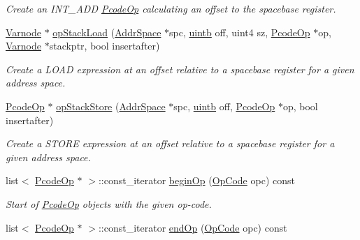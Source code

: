 \begin{DoxyCompactItemize}
\begin{DoxyCompactList}\small\item\em Create an I\+N\+T\+\_\+\+A\+DD \mbox{\hyperlink{class_pcode_op}{Pcode\+Op}} calculating an offset to the {\itshape spacebase} register. \end{DoxyCompactList}\item 
\mbox{\hyperlink{class_varnode}{Varnode}} $\ast$ \mbox{\hyperlink{class_funcdata_a37b36505bab6f7c5676157288e65d5c6}{op\+Stack\+Load}} (\mbox{\hyperlink{class_addr_space}{Addr\+Space}} $\ast$spc, \mbox{\hyperlink{types_8h_a2db313c5d32a12b01d26ac9b3bca178f}{uintb}} off, uint4 sz, \mbox{\hyperlink{class_pcode_op}{Pcode\+Op}} $\ast$op, \mbox{\hyperlink{class_varnode}{Varnode}} $\ast$stackptr, bool insertafter)
\begin{DoxyCompactList}\small\item\em Create a L\+O\+AD expression at an offset relative to a {\itshape spacebase} register for a given address space. \end{DoxyCompactList}\item 
\mbox{\hyperlink{class_pcode_op}{Pcode\+Op}} $\ast$ \mbox{\hyperlink{class_funcdata_a4582ad34b4e7c851d92db8544999eaf3}{op\+Stack\+Store}} (\mbox{\hyperlink{class_addr_space}{Addr\+Space}} $\ast$spc, \mbox{\hyperlink{types_8h_a2db313c5d32a12b01d26ac9b3bca178f}{uintb}} off, \mbox{\hyperlink{class_pcode_op}{Pcode\+Op}} $\ast$op, bool insertafter)
\begin{DoxyCompactList}\small\item\em Create a S\+T\+O\+RE expression at an offset relative to a {\itshape spacebase} register for a given address space. \end{DoxyCompactList}\item 
list$<$ \mbox{\hyperlink{class_pcode_op}{Pcode\+Op}} $\ast$ $>$\+::const\+\_\+iterator \mbox{\hyperlink{class_funcdata_a47de4c82b4a74b356153eb8e4215f639}{begin\+Op}} (\mbox{\hyperlink{opcodes_8hh_abeb7dfb0e9e2b3114e240a405d046ea7}{Op\+Code}} opc) const
\begin{DoxyCompactList}\small\item\em Start of \mbox{\hyperlink{class_pcode_op}{Pcode\+Op}} objects with the given op-\/code. \end{DoxyCompactList}\item 
list$<$ \mbox{\hyperlink{class_pcode_op}{Pcode\+Op}} $\ast$ $>$\+::const\+\_\+iterator \mbox{\hyperlink{class_funcdata_ad24461680d41c61349b3717283d8b854}{end\+Op}} (\mbox{\hyperlink{opcodes_8hh_abeb7dfb0e9e2b3114e240a405d046ea7}{Op\+Code}} opc) const

\end{DoxyCompactItemize}

